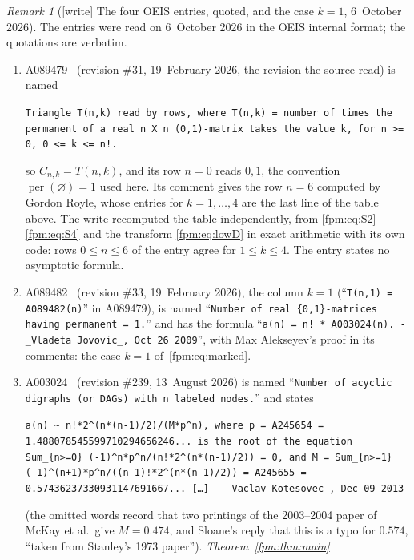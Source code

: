 \documentclass[11pt]{article}
\theoremstyle{definition}\newtheorem{definition}[theorem]{Definition}
\theoremstyle{remark}\newtheorem{remark}[theorem]{Remark}
\newcommand{\Per}{\operatorname{per}}
\begin{document}
\begin{remark}[{[write]} The four OEIS entries, quoted, and the case $k=1$, 6~October 2026]\label{fpm:rem:oeis}
The entries were read on 6~October 2026 in the OEIS internal format; the
quotations are verbatim.
\begin{enumerate}[label=(\alph*)]
\item A089479~\cite{oeis} (revision \#31, 19~February 2026, the revision the
 source read) is named
 \begin{center}\small
 \parbox{0.92\textwidth}{\raggedright\texttt{Triangle T(n,k) read by rows, where T(n,k) = number of times the permanent of a real n X n (0,1)-matrix takes the value k, for n >= 0, 0 <= k <= n!.}}
 \end{center}
 so $C_{n,k}=T(n,k)$, and its row $n=0$ reads $0,1$, the convention
 $\Per(\varnothing)=1$ used here. Its comment gives the row $n=6$ computed by
 Gordon Royle, whose entries for $k=1,\dots,4$ are the last line of the table
 above. The write recomputed the table independently, from
 \eqref{fpm:eq:S2}--\eqref{fpm:eq:S4} and the transform
 \eqref{fpm:eq:lowD} in exact arithmetic with its own code: rows $0\le n\le6$
 of the entry agree for $1\le k\le4$. The entry states no asymptotic formula.
\item A089482~\cite{perone} (revision \#33, 19~February 2026), the column
 $k=1$ (``\texttt{T(n,1) = A089482(n)}'' in A089479), is named
 ``\texttt{Number of real \{0,1\}-matrices having permanent = 1.}'' and has
 the formula ``\texttt{a(n) = n! * A003024(n). - \_Vladeta Jovovic\_, Oct 26
 2009}'', with Max Alekseyev's proof in its comments: the case $k=1$
 of~\eqref{fpm:eq:marked}.
\item A003024~\cite{dag} (revision \#239, 13~August 2026) is named
 ``\texttt{Number of acyclic digraphs (or DAGs) with n labeled nodes.}'' and
 states
 \begin{center}\small
 \parbox{0.92\textwidth}{\raggedright\texttt{a(n) \textasciitilde{} n!*2\^{}(n*(n-1)/2)/(M*p\^{}n), where p = A245654 = 1.488078545599710294656246... is the root of the equation Sum\_\{n>=0\} (-1)\^{}n*p\^{}n/(n!*2\^{}(n*(n-1)/2)) = 0, and M = Sum\_\{n>=1\} (-1)\^{}(n+1)*p\^{}n/((n-1)!*2\^{}(n*(n-1)/2)) = A245655 = 0.57436237330931147691667... [\dots] - \_Vaclav Kotesovec\_, Dec 09 2013}}
 \end{center}
 (the omitted words record that two printings of the 2003--2004 paper of
 McKay et al.\ give $M=0.474$, and Sloane's reply that this is a typo for
 $0.574$, ``taken from Stanley's 1973 paper''). \emph{Theorem~\ref{fpm:thm:main}
}
\end{enumerate}
\end{remark}
\end{document}
